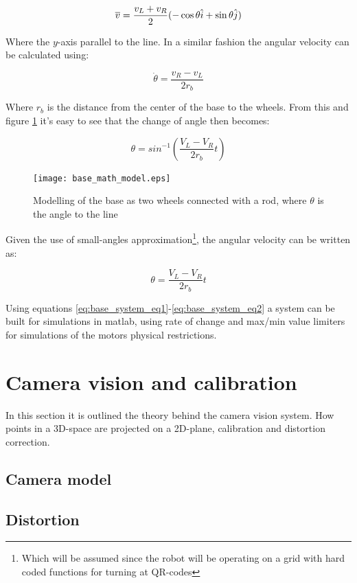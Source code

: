 \begin{equation}
    \overline{v}= \frac{v_L+v_R}{2}(-\cos \theta \hat{i}+ \sin \theta \Hat{j})
\end{equation}

\noindent Where the $y$-axis parallel to the line. In a similar fashion the angular velocity can be calculated using:

\begin{equation}
    \Dot{\theta} = \frac{v_R-v_L}{2r_{b}}
    \label{eq:base_system_eq2}
\end{equation}

\noindent Where $r_{b}$ is the distance from the center of the base to the wheels. From this and figure \ref{fig:base_math_model} it's easy to see that the change of angle then becomes:

\begin{equation}
    \theta = sin^{-1}\left(\frac{V_L-V_R}{2r_{b}}t\right)
\end{equation}

\begin{figure}[H]
    \centering
    \texttt{[image: base\_math\_model.eps]}
    \caption{Modelling of the base as two wheels connected with a rod, where $\theta$ is the angle to the line}
    \label{fig:base_math_model}
\end{figure}

Given the use of small-angles approximation\footnote{Which will be assumed since the robot will be operating on a grid with hard coded functions for turning at QR-codes}, the angular velocity can be written as:

\begin{equation}
    \theta = \frac{V_L-V_R}{2r_{b}}t
\end{equation}


\noindent Using equations \eqref{eq:base_system_eq1}-\eqref{eq:base_system_eq2} a system can be built for simulations in matlab, using rate of change and max/min value limiters for simulations of the motors physical restrictions.



\section*{Camera vision and calibration}
In this section it is outlined the theory behind the camera vision system. 
How points in a 3D-space are projected on a 2D-plane, calibration and distortion correction. 
\subsection*{Camera model}
\subsection*{Distortion}
